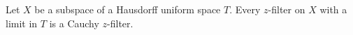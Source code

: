 Let $X$ be a subspace of a Hausdorff uniform space $T$. Every $z$-filter on $X$ with a limit in $T$ is a Cauchy $z$-filter.
